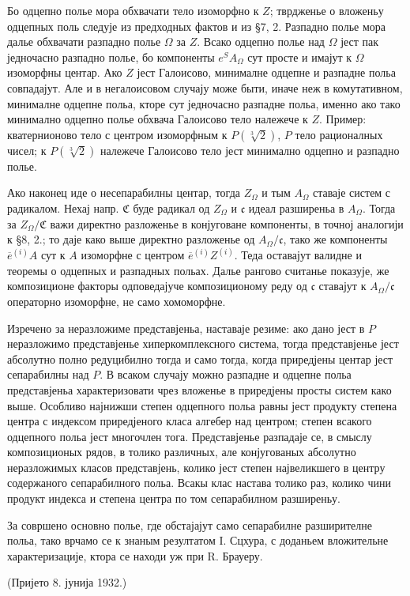﻿\documentclass[11pt]{article}
\begin{document}
Бо одцепно полье мора обхвачати тело изоморфно к \(Z\); тврдженье о вложеньу одцепных поль следује из предходных фактов и из §7, 2. Разпадно полье мора далье обхвачати разпадно полье \(\Omega\) за \(Z\). Всако одцепно полье над \(\Omega\) јест пак једночасно разпадно полье, бо компоненты \(e^S A_\Omega\) сут просте и имајут к \(\Omega\) изоморфны центар. Ако \(Z\) јест Галоисово, минималне одцепне и разпадне польа совпадајут. Але и в негалоисовом случају може быти, иначе неж в комутативном, минималне одцепне польа, кторе сут једночасно разпадне польа, именно ако тако минимално одцепно полье обхвача Галоисово тело належече к \(Z\). Пример: кватернионово тело с центром изоморфным к \(P(\sqrt[3]{2})\), \(P\) тело рационалных чисел; к \(P(\sqrt[3]{2})\) належече Галоисово тело јест минимално одцепно и разпадно полье.

Ако наконец иде о несепарабилны центар, тогда \(Z_\Omega\) и тым \(A_\Omega\) ставаје систем с радикалом. Нехај напр. \(\mathfrak C\) буде радикал од \(Z_\Omega\) и \(\mathfrak c\) идеал разширеньа в \(A_\Omega\). Тогда за \(Z_\Omega/\mathfrak C\) важи директно разложенье в конјуговане компоненты, в точној аналогији к §8, 2.; то даје како выше директно разложенье од \(A_\Omega/\mathfrak c\), тако же компоненты \(\overline e^{(i)}A\) сут к \(A\) изоморфне с центром \(\overline e^{(i)}Z^{(i)}\). Теда оставајут валидне и теоремы о одцепных и разпадных польах. Далье рангово считанье показује, же композиционе факторы одповедајуче композиционому реду од \(\mathfrak c\) ставајут к \(A_\Omega/\mathfrak c\) операторно изоморфне, не само хомоморфне.

Изречено за неразложиме представјеньа, наставаје резиме: ако дано јест в \(P\) неразложимо представјенье хиперкомплексного система, тогда представјенье јест абсолутно полно редуцибилно тогда и само тогда, когда приредјены центар јест сепарабилны над \(P\). В всаком случају можно разпадне и одцепне польа представјеньа характеризовати чрез вложенье в приредјены просты систем како выше. Особливо најнижши степен одцепного польа равны јест продукту степена центра с индексом приредјеного класа алгебер над центром; степен всакого одцепного польа јест многочлен тога. Представјенье разпадаје се, в смыслу композиционых рядов, в толико различных, але конјугованых абсолутно неразложимых класов представјень, колико јест степен највеликшего в центру содержаного сепарабилного польа. Всакы клас настава толико раз, колико чини продукт индекса и степена центра по том сепарабилном разширеньу.

За совршено основно полье, где обстајајут само сепарабилне разширителне польа, тако врчамо се к знаным резултатом I. Сцхура, с доданьем вложительне характеризације, ктора се находи уж при R. Брауеру.

\begin{center}
(Пријето 8. јунија 1932.)
\end{center}
\end{document}
